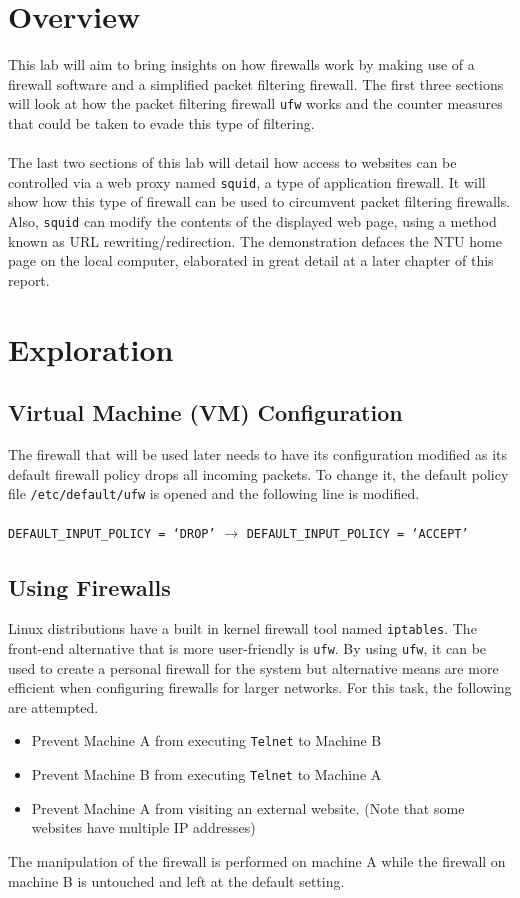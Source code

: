 \documentclass[a4paper,12pt]{article}
\begin{document}
\section{Overview}
This lab will aim to bring insights on how firewalls work by making use of a firewall software and a simplified packet filtering firewall. The first three sections will look at how the packet filtering firewall \texttt{ufw} works and the counter measures that could be taken to evade this type of filtering.\\\\The last two sections of this lab will detail how access to websites can be controlled via a web proxy named \texttt{squid}, a type of application firewall. It will show how this type of firewall can be used to circumvent packet filtering firewalls. Also, \texttt{squid} can modify the contents of the displayed web page, using a method known as URL rewriting/redirection. The demonstration defaces the NTU home page on the local computer, elaborated in great detail at a later chapter of this report. 
\section{Exploration}
\subsection{Virtual Machine (VM) Configuration}
The firewall that will be used later needs to have its configuration modified as its default firewall policy drops all incoming packets. To change it, the default policy file \texttt{/etc/default/ufw} is opened and the following line is modified.\\\\
\texttt{DEFAULT\_INPUT\_POLICY = `DROP'} $\rightarrow$ \texttt{DEFAULT\_INPUT\_POLICY = `ACCEPT'}
\subsection{Using Firewalls}
Linux distributions have a built in kernel firewall tool named \texttt{iptables}. The front-end alternative that is more user-friendly is \texttt{ufw}. By using \texttt{ufw}, it can be used to create a personal firewall for the system but alternative means are more efficient when configuring firewalls for larger networks. For this task, the following are attempted.
\begin{itemize}
\item Prevent Machine A from executing \texttt{Telnet} to Machine B
\item Prevent Machine B from executing \texttt{Telnet} to Machine A
\item Prevent Machine A from visiting an external website. (Note that some websites have multiple IP addresses)
\end{itemize}
The manipulation of the firewall is performed on machine A while the firewall on machine B is untouched and left at the default setting.
\end{document}
